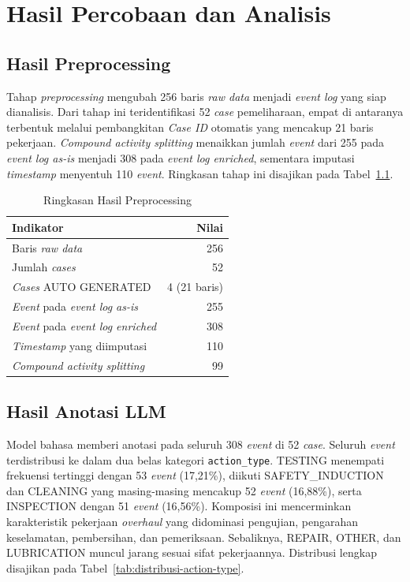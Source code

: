 \chapter{Hasil Percobaan dan Analisis}

\section{Hasil Preprocessing}

Tahap \textit{preprocessing} mengubah 256 baris \textit{raw data} menjadi \textit{event log} yang siap dianalisis. Dari tahap ini teridentifikasi 52 \textit{case} pemeliharaan, empat di antaranya terbentuk melalui pembangkitan \textit{Case ID} otomatis yang mencakup 21 baris pekerjaan. \textit{Compound activity splitting} menaikkan jumlah \textit{event} dari 255 pada \textit{event log as-is} menjadi 308 pada \textit{event log enriched}, sementara imputasi \textit{timestamp} menyentuh 110 \textit{event}. Ringkasan tahap ini disajikan pada Tabel~\ref{tab:ringkasan-preprocessing}.

\begin{table}[H]
\centering
\caption{Ringkasan Hasil Preprocessing}
\label{tab:ringkasan-preprocessing}
\begin{tabular}{lr}
\toprule
\textbf{Indikator} & \textbf{Nilai} \\
\midrule
Baris \textit{raw data} & 256 \\
Jumlah \textit{cases} & 52 \\
\textit{Cases} AUTO GENERATED       & 4 (21 baris) \\
\textit{Event} pada \textit{event log as-is} & 255 \\
\textit{Event} pada \textit{event log enriched} & 308 \\
\textit{Timestamp} yang diimputasi & 110 \\
\textit{Compound activity splitting} & 99 \\
\bottomrule
\end{tabular}
\end{table}

\section{Hasil Anotasi LLM}

Model bahasa memberi anotasi pada seluruh 308 \textit{event} di 52 \textit{case}. Seluruh \textit{event} terdistribusi ke dalam dua belas kategori \texttt{action\_type}. TESTING menempati frekuensi tertinggi dengan 53 \textit{event} (17,21\%), diikuti SAFETY\_INDUCTION dan CLEANING yang masing-masing mencakup 52 \textit{event} (16,88\%), serta INSPECTION dengan 51 \textit{event} (16,56\%). Komposisi ini mencerminkan karakteristik pekerjaan \textit{overhaul} yang didominasi pengujian, pengarahan keselamatan, pembersihan, dan pemeriksaan. Sebaliknya, REPAIR, OTHER, dan LUBRICATION muncul jarang sesuai sifat pekerjaannya. Distribusi lengkap disajikan pada Tabel~\ref{tab:distribusi-action-type}.

